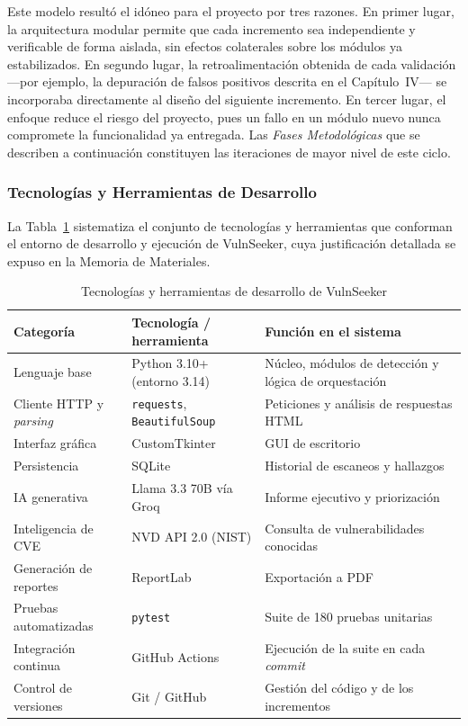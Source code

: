 \documentclass[12pt, a4paper]{article}
\begin{document}
Este modelo resultó el idóneo para el proyecto por tres razones. En primer lugar,
la arquitectura modular permite que cada incremento sea independiente y
verificable de forma aislada, sin efectos colaterales sobre los módulos ya
estabilizados. En segundo lugar, la retroalimentación obtenida de cada validación
---por ejemplo, la depuración de falsos positivos descrita en el Capítulo~IV---
se incorporaba directamente al diseño del siguiente incremento. En tercer lugar,
el enfoque reduce el riesgo del proyecto, pues un fallo en un módulo nuevo nunca
compromete la funcionalidad ya entregada. Las \textit{Fases Metodológicas} que se
describen a continuación constituyen las iteraciones de mayor nivel de este ciclo.

\subsubsection{Tecnologías y Herramientas de Desarrollo}

La Tabla~\ref{tab:tecnologias} sistematiza el conjunto de tecnologías y
herramientas que conforman el entorno de desarrollo y ejecución de VulnSeeker,
cuya justificación detallada se expuso en la Memoria de Materiales.

\begin{table}[H]
    \centering
    \caption{Tecnologías y herramientas de desarrollo de VulnSeeker}
    \label{tab:tecnologias}
    \small
    \begin{tabular}{p{3.6cm} p{4.4cm} p{5.2cm}}
        \toprule
        \textbf{Categoría} & \textbf{Tecnología / herramienta} & \textbf{Función en el sistema} \\
        \midrule
        Lenguaje base & Python 3.10+ (entorno 3.14) & Núcleo, módulos de detección y lógica de orquestación \\
        Cliente HTTP y \textit{parsing} & \texttt{requests}, \texttt{BeautifulSoup} & Peticiones y análisis de respuestas HTML \\
        Interfaz gráfica & CustomTkinter & GUI de escritorio \\
        Persistencia & SQLite & Historial de escaneos y hallazgos \\
        IA generativa & Llama 3.3 70B vía Groq & Informe ejecutivo y priorización \\
        Inteligencia de CVE & NVD API 2.0 (NIST) & Consulta de vulnerabilidades conocidas \\
        Generación de reportes & ReportLab & Exportación a PDF \\
        Pruebas automatizadas & \texttt{pytest} & Suite de 180 pruebas unitarias \\
        Integración continua & GitHub Actions & Ejecución de la suite en cada \textit{commit} \\
        Control de versiones & Git / GitHub & Gestión del código y de los incrementos \\
        \bottomrule
    \end{tabular}
\end{table}
\end{document}
